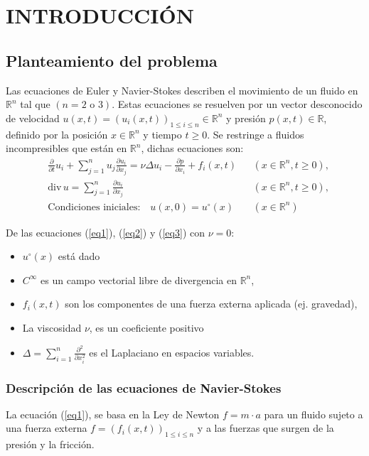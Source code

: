 \chapter{INTRODUCCIÓN}
\section{Planteamiento del problema}
Las ecuaciones de Euler y Navier-Stokes describen el movimiento de un fluido en $\mathbb{R}^n$ tal que $(n=2\text{ o }3)$. Estas ecuaciones se resuelven por un vector desconocido de velocidad $u(x,t)= \left(u_i(x,t)\right)_{1\leq i \leq n}\in \mathbb{R}^n$ y presión $p(x,t)\in \mathbb{R}$, definido por la posición $x\in \mathbb{R}^n$ y tiempo $t\geq 0$. Se restringe a fluidos incompresibles que están en $\mathbb{R}^n$, dichas ecuaciones son:
\begin{align}
    &\frac{\partial}{\partial t} u_i + \sum_{j = 1}^n u_j \frac{\partial u_i}{\partial x_j} = \nu \Delta u_i - \frac{\partial p}{\partial x_i} + f_i(x,t)&& \left(x\in \mathbb{R}^n, t\geq 0\right),\label{eq1}\\
    &\text{div}\, u = \sum_{j = 1}^n \frac{\partial u_i}{\partial x_j} && \left(x\in \mathbb{R}^n, t\geq 0\right),\label{eq2}\\
    &\text{Condiciones iniciales:}\quad u(x,0) = u^{\circ}(x) && \left(x\in \mathbb{R}^n\right)\label{eq3}
\end{align}
\begin{notation}
De las ecuaciones (\ref{eq1}), (\ref{eq2}) y (\ref{eq3}) con $\nu=0$:
    \begin{itemize}
        \item $u^{\circ}(x)$ está dado
        \item $C^{\infty}$  es un campo vectorial libre de divergencia en $\mathbb{R}^n$,
        \item $f_i(x,t)$ son los componentes de una fuerza externa aplicada (ej. gravedad),
        \item La viscosidad $\nu$, es un coeficiente positivo
        \item $\Delta = \sum_{i=1}^n \frac{\partial^2}{\partial x_i^2}$ es el Laplaciano en espacios variables.
    \end{itemize}    
\end{notation}
\subsection{Descripción de las ecuaciones de Navier-Stokes}
La ecuación (\ref{eq1}), se basa en la Ley de Newton $f=m\cdot a$ para un fluido sujeto a una fuerza externa $f= \left(f_i(x,t)\right)_{1\leq i\leq n}$ y a las fuerzas que surgen de la presión y la fricción.

